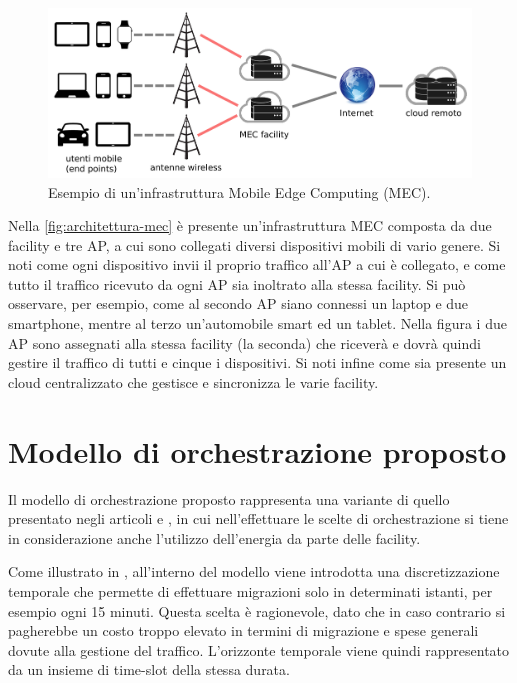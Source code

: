 \begin{figure}[t]
    \centering
    \includegraphics[width = 150mm]{img/esempio-infrastruttura-mec.jpg}
    \caption{Esempio di un'infrastruttura Mobile Edge Computing (MEC).}
    \label{fig:architettura-mec}
\end{figure}

Nella \autoref{fig:architettura-mec} è presente un'infrastruttura MEC composta da due facility e tre AP, a cui sono collegati diversi dispositivi mobili di vario genere. Si noti come ogni dispositivo invii il proprio traffico all'AP a cui è collegato, e come tutto il traffico ricevuto da ogni AP sia inoltrato alla stessa facility. Si può osservare, per esempio, come al secondo AP siano connessi un laptop e due smartphone, mentre al terzo un'automobile smart ed un tablet. Nella figura i due AP sono assegnati alla stessa facility (la seconda) che riceverà e dovrà quindi gestire il traffico di tutti e cinque i dispositivi. Si noti infine come sia presente un cloud centralizzato che gestisce e sincronizza le varie facility.


%
%
\section{Modello di orchestrazione proposto}
\label{sec:modello-di-orchestrazione-proposto}

Il modello di orchestrazione proposto rappresenta una variante di quello presentato negli articoli \cite{assignment-patterns} e \cite{analytics-mec}, in cui nell'effettuare le scelte di orchestrazione si tiene in considerazione anche l'utilizzo dell'energia da parte delle facility.

Come illustrato in \cite{analytics-mec}, all'interno del modello viene introdotta una discretizzazione temporale che permette di effettuare migrazioni solo in determinati istanti, per esempio ogni 15 minuti. Questa scelta è ragionevole, dato che in caso contrario si pagherebbe un costo troppo elevato in termini di migrazione e spese generali dovute alla gestione del traffico. L'orizzonte temporale viene quindi rappresentato da un insieme di time-slot della stessa durata.

